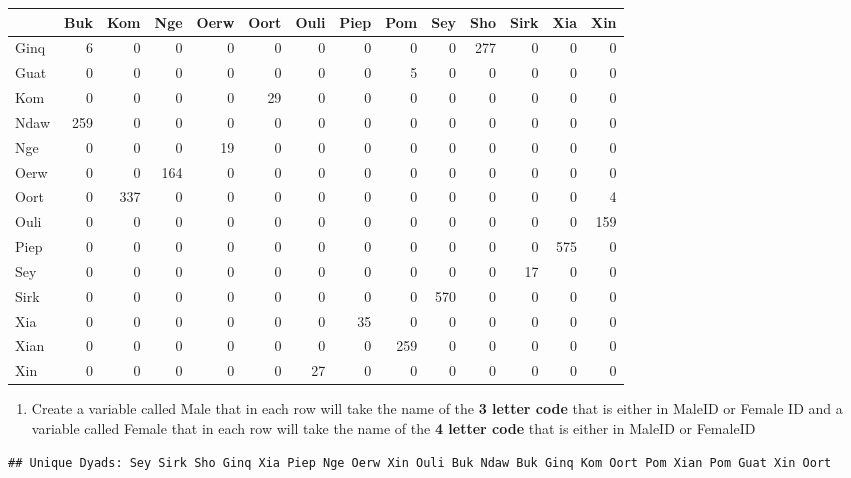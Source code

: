 \documentclass[
]{article}
\providecommand{\tightlist}{%
  \setlength{\itemsep}{0pt}\setlength{\parskip}{0pt}}
\begin{document}
\begin{longtable}[]{@{}lrrrrrrrrrrrrr@{}}
\toprule
& Buk & Kom & Nge & Oerw & Oort & Ouli & Piep & Pom & Sey & Sho & Sirk &
Xia & Xin \\
\midrule
\endhead
Ginq & 6 & 0 & 0 & 0 & 0 & 0 & 0 & 0 & 0 & 277 & 0 & 0 & 0 \\
Guat & 0 & 0 & 0 & 0 & 0 & 0 & 0 & 5 & 0 & 0 & 0 & 0 & 0 \\
Kom & 0 & 0 & 0 & 0 & 29 & 0 & 0 & 0 & 0 & 0 & 0 & 0 & 0 \\
Ndaw & 259 & 0 & 0 & 0 & 0 & 0 & 0 & 0 & 0 & 0 & 0 & 0 & 0 \\
Nge & 0 & 0 & 0 & 19 & 0 & 0 & 0 & 0 & 0 & 0 & 0 & 0 & 0 \\
Oerw & 0 & 0 & 164 & 0 & 0 & 0 & 0 & 0 & 0 & 0 & 0 & 0 & 0 \\
Oort & 0 & 337 & 0 & 0 & 0 & 0 & 0 & 0 & 0 & 0 & 0 & 0 & 4 \\
Ouli & 0 & 0 & 0 & 0 & 0 & 0 & 0 & 0 & 0 & 0 & 0 & 0 & 159 \\
Piep & 0 & 0 & 0 & 0 & 0 & 0 & 0 & 0 & 0 & 0 & 0 & 575 & 0 \\
Sey & 0 & 0 & 0 & 0 & 0 & 0 & 0 & 0 & 0 & 0 & 17 & 0 & 0 \\
Sirk & 0 & 0 & 0 & 0 & 0 & 0 & 0 & 0 & 570 & 0 & 0 & 0 & 0 \\
Xia & 0 & 0 & 0 & 0 & 0 & 0 & 35 & 0 & 0 & 0 & 0 & 0 & 0 \\
Xian & 0 & 0 & 0 & 0 & 0 & 0 & 0 & 259 & 0 & 0 & 0 & 0 & 0 \\
Xin & 0 & 0 & 0 & 0 & 0 & 27 & 0 & 0 & 0 & 0 & 0 & 0 & 0 \\
\bottomrule
\end{longtable}

\begin{enumerate}
\def\labelenumi{\arabic{enumi}.}
\tightlist
\item
  Create a variable called Male that in each row will take the name of
  the \textbf{3 letter code} that is either in MaleID or Female ID and a
  variable called Female that in each row will take the name of the
  \textbf{4 letter code} that is either in MaleID or FemaleID
\end{enumerate}

\begin{verbatim}
## Unique Dyads: Sey Sirk Sho Ginq Xia Piep Nge Oerw Xin Ouli Buk Ndaw Buk Ginq Kom Oort Pom Xian Pom Guat Xin Oort
\end{verbatim}
\end{document}
